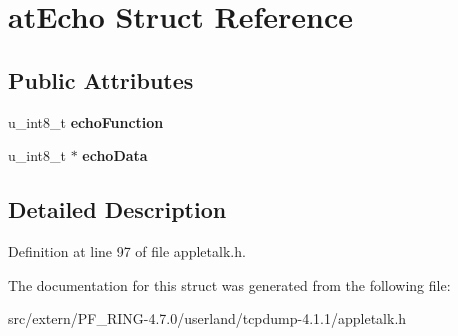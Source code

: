 \hypertarget{structat_echo}{
\section{atEcho Struct Reference}
\label{structat_echo}
}
\subsection*{Public Attributes}
\begin{DoxyCompactItemize}
\item 
\hypertarget{structat_echo_ac17338a4cbb69aa17f7ede295ae10c1e}{
u\_\-int8\_\-t {\bfseries echoFunction}}
\label{structat_echo_ac17338a4cbb69aa17f7ede295ae10c1e}

\item 
\hypertarget{structat_echo_ab7554e0c827d428a0403171074f861f9}{
u\_\-int8\_\-t $\ast$ {\bfseries echoData}}
\label{structat_echo_ab7554e0c827d428a0403171074f861f9}

\end{DoxyCompactItemize}


\subsection{Detailed Description}


Definition at line 97 of file appletalk.h.



The documentation for this struct was generated from the following file:\begin{DoxyCompactItemize}
\item 
src/extern/PF\_\-RING-\/4.7.0/userland/tcpdump-\/4.1.1/appletalk.h\end{DoxyCompactItemize}
